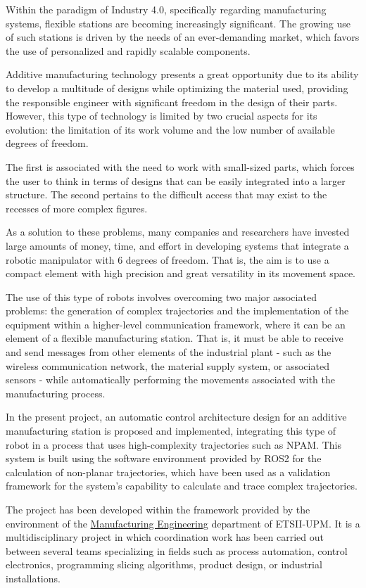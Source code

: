 Within the paradigm of Industry 4.0, specifically regarding manufacturing systems, flexible stations are becoming increasingly significant. The growing use of such stations is driven by the needs of an ever-demanding market, which favors the use of personalized and rapidly scalable components.

Additive manufacturing technology presents a great opportunity due to its ability to develop a multitude of designs while optimizing the material used, providing the responsible engineer with significant freedom in the design of their parts. However, this type of technology is limited by two crucial aspects for its evolution: the limitation of its work volume and the low number of available degrees of freedom.

The first is associated with the need to work with small-sized parts, which forces the user to think in terms of designs that can be easily integrated into a larger structure. The second pertains to the difficult access that may exist to the recesses of more complex figures.

As a solution to these problems, many companies and researchers have invested large amounts of money, time, and effort in developing systems that integrate a robotic manipulator with 6 degrees of freedom. That is, the aim is to use a compact element with high precision and great versatility in its movement space.

The use of this type of robots involves overcoming two major associated problems: the generation of complex trajectories and the implementation of the equipment within a higher-level communication framework, where it can be an element of a flexible manufacturing station. That is, it must be able to receive and send messages from other elements of the industrial plant - such as the wireless communication network, the material supply system, or associated sensors - while automatically performing the movements associated with the manufacturing process.

In the present project, an automatic control architecture design for an additive manufacturing station is proposed and implemented, integrating this type of robot in a process that uses high-complexity trajectories such as \acrfull{NPAM}. This system is built using the software environment provided by ROS2 for the calculation of non-planar trajectories, which have been used as a validation framework for the system's capability to calculate and trace complex trajectories.

The project has been developed within the framework provided by the environment of the \hyperlink{https://fabricacion.industriales.upm.es/}{Manufacturing Engineering} department of ETSII-UPM. It is a multidisciplinary project in which coordination work has been carried out between several teams specializing in fields such as process automation, control electronics, programming slicing algorithms, product design, or industrial installations.

